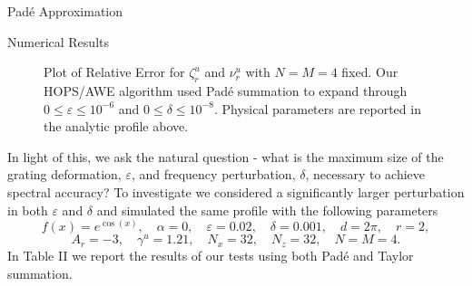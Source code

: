\begin{section}{Pad\'e Approximation}
\begin{section}{Numerical Results}
\vspace{-42mm}
\begin{figure}[H]
\centering
\vspace{3mm}
\caption{Plot of Relative Error for $\zeta^u_r$ and $\nu^u_r$ with $N=M=4$ fixed. Our HOPS/AWE algorithm used Padé summation to expand through $0 \leq \varepsilon \leq 10^{-6}$ and $0 \leq \delta \leq 10^{-8}$. Physical parameters are reported in the analytic profile above.}
\end{figure}
\vspace{-18mm}
In light of this, we ask the natural question - what is the maximum size of the grating deformation, $\varepsilon$, and frequency perturbation, $\delta$, necessary to achieve spectral accuracy? To investigate we considered a significantly larger perturbation in both $\varepsilon$ and $\delta$ and simulated the same profile with the following parameters
$$f(x)=e^{\cos(x)},\quad \alpha = 0, \quad \varepsilon = 0.02, \quad \delta = 0.001, \quad d=2\pi,\quad r=2,$$
$$A_r=-3,\quad \gamma^u = 1.21, \quad N_x = 32,\quad N_z=32, \quad N=M=4.$$
In Table II we report the results of our tests using both Padé and Taylor summation.

\end{section}
\end{section}
